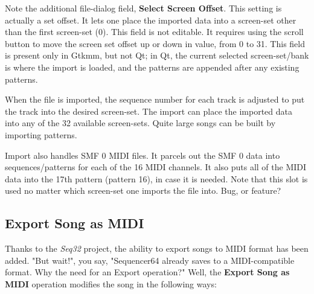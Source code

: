    Note the additional file-dialog field,
   \textbf{Select Screen Offset}.
   This setting is actually a set offset.
   It lets one place the imported data into a screen-set other than
   the first screen-set (0).
   This field is not editable.
   It requires using the scroll button to move the
   screen set offset up or down in value, from 0 to 31.
   This field is present only in Gtkmm, but not Qt;
   in Qt, the current selected screen-set/bank is where the import is loaded,
   and the patterns are appended after any existing patterns.

   When the file is imported, the sequence number for each track is
   adjusted to put the track into the desired screen-set.
   The import can place the imported data into any of the 32 available
   screen-sets.  Quite large songs can be built by importing patterns.

   Import also handles SMF 0 MIDI files.  It parcels out the SMF 0 data
   into sequences/patterns for each of the 16 MIDI channels.  It also puts
   all of the MIDI data into the 17th pattern (pattern 16), in case it is
   needed.  Note that this slot is used no matter which screen-set one imports
   the file into.  Bug, or feature?

\subsection{Export Song as MIDI}
\label{subsec:seq64_midi_export_file_export}

   Thanks to the \textsl{Seq32} project, the ability to export songs to MIDI
   format has been added.
   "But wait!", you say, "Sequencer64 already saves to a MIDI-compatible
   format.  Why the need for an Export operation?"
   Well, the \textbf{Export Song as MIDI} operation modifies the song in the
   following ways:


